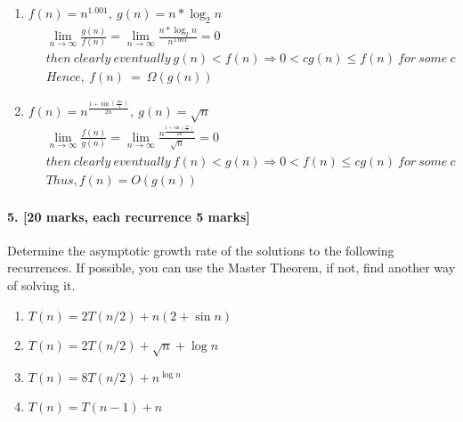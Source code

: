 \documentclass[a4paper]{scrartcl}
\begin{document}
\begin{enumerate}[label=(\alph*)]
  \item $f(n)=n^{1.001},\ g(n)=n*\log_2{n}$
  \begin{align*}
    &\ \lim_{n\to\infty} \frac{g(n)}{f(n)}=\lim_{n\to\infty} \frac{n*\log_2{n}}{n^{1.001}}=0\\ &\
    then\ clearly\ eventually\ g(n)<f(n)\Rightarrow 0<cg(n)\leq f(n)\ for\ some\ c\\ &\
    Hence,\ f(n)\ =\ \Omega(g(n))
  \end{align*}
  \item $f(n)=n^{\frac{1+\sin(\frac{\pi n}{2})}{2n}},\ g(n)=\sqrt{n}$
  \begin{align*}
    &\ \lim_{n\to\infty} \frac{f(n)}{g(n)}=\lim_{n\to\infty} \frac{n^{\frac{1+\sin(\frac{\pi n}{2})}{2n}}}{\sqrt{n}}=0\\ &\
    then\ clearly\ eventually\ f(n)<g(n)\Rightarrow 0<f(n)\leq cg(n)\ for\ some\ c\\ &\
    Thus, f(n)=O(g(n))
  \end{align*}
\end{enumerate}
\paragraph{5. [20 marks, each recurrence 5 marks]}
\label{sec:Question 5}
Determine the asymptotic growth rate of the solutions to the following recurrences. If possible, you can use the Master Theorem, if not, find another way of solving it.
\begin{enumerate}[label=(\alph*)]
  \item $T (n) = 2T (n/2) + n(2 + \sin{n})$
  \item $T (n) = 2T (n/2) + \sqrt{n} + \log{n}$
  \item $T (n) = 8T (n/2) + n^{\log{n}}$
  \item $T (n) = T (n − 1) + n$
\end{enumerate}
\end{document}
